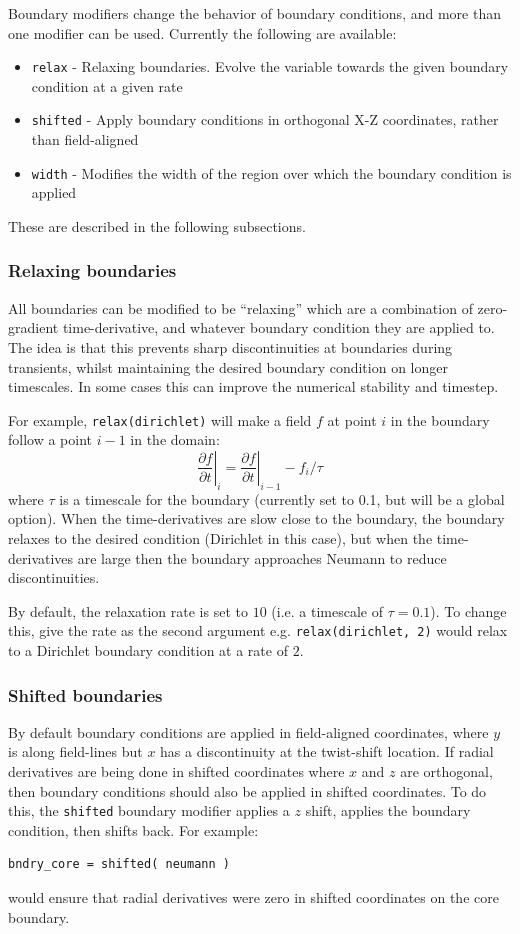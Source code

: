 \documentclass[12pt]{article}
\newcommand{\code}[1]{\texttt{#1}}
\newcommand{\deriv}[2]{\ensuremath{\frac{\partial #1}{\partial #2}}}
\begin{document}
Boundary modifiers change the behavior of boundary conditions, and more than one modifier
can be used. Currently the following are available:
\begin{itemize}
\item \code{relax} - Relaxing boundaries. Evolve the variable towards the given boundary condition at
  a given rate
\item \code{shifted} - Apply boundary conditions in orthogonal X-Z coordinates, rather than
  field-aligned
\item \code{width} - Modifies the width of the region over which the boundary condition is applied
\end{itemize}
These are described in the following subsections.

\subsubsection{Relaxing boundaries}

All boundaries can be modified to be ``relaxing'' which are a combination
of zero-gradient time-derivative, and whatever boundary condition they are
applied to. The idea is that this prevents sharp discontinuities at boundaries
during transients, whilst maintaining the desired boundary condition on
longer timescales. In some cases this can improve the numerical stability
and timestep.

For example, \code{relax(dirichlet)} will make a field $f$ at point $i$ in the
boundary follow a point $i-1$ in the domain:
\[
\left.\deriv{f}{t}\right|_i = \left.\deriv{f}{t}\right|_{i-1}  - f_i / \tau
\]
where $\tau$ is a timescale for the boundary (currently set to 0.1, but will
be a global option).
When the time-derivatives are slow close to the boundary, the boundary
relaxes to the desired condition (Dirichlet in this case), but when the
time-derivatives are large then the boundary approaches Neumann to reduce
discontinuities.

By default, the relaxation rate is set to $10$ (i.e. a timescale of $\tau=0.1$).
To change this, give the rate as the second argument e.g. \code{relax(dirichlet, 2)} would relax to a Dirichlet boundary condition at a rate of $2$.

\subsubsection{Shifted boundaries}

By default boundary conditions are applied in field-aligned coordinates, where $y$ is along field-lines but
$x$ has a discontinuity at the twist-shift location. If radial derivatives are being done in shifted
coordinates where $x$ and $z$ are orthogonal, then boundary conditions should also be applied in
shifted coordinates. To do this, the \code{shifted} boundary modifier applies a $z$ shift, applies
the boundary condition, then shifts back. For example:
\begin{lstlisting}[numbers=none]
bndry_core = shifted( neumann )
\end{lstlisting}
would ensure that radial derivatives were zero in shifted coordinates on the core boundary.
\end{document}
